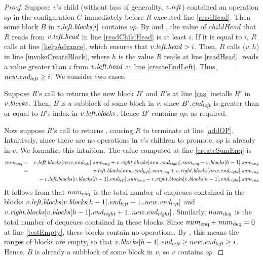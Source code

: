 \begin{proof}
Suppose $v$'s child (without loss of generality, $v.\mbox{\textit{left}}$) contained an operation $op$ 
in the configuration $C$ immediately before $R$ executed line \ref{readHead}.
Then some block $B$ in $v.\mbox{\textit{left.blocks}}[i]$ contains $op$.
By  and , the value of $childHead$ that $R$ reads from
$v.\mbox{\textit{left.head}}$ in line \ref{readChildHead} is at least $i$.
If it is equal to $i$, $R$ calls  at line \ref{helpAdvance}, which ensures that 
$v.\mbox{\textit{left.head}} > i$.
Then, $R$ calls ($v,h$) in line \ref{invokeCreateBlock}, where $h$ is the value $R$ reads at line \ref{readHead}.
 reads a value greater than $i$ from $v.\mbox{\textit{left.head}}$ at line \ref{createEndLeft}.
Thus, $new.\mbox{\textit{end\textsubscript{left}}} \geq i$.  We consider two cases.

Suppose $R$'s call to  returns the new block $B'$ and $R$'s  at line \ref{cas} 
installs $B'$ in $v.\mbox{\textit{blocks}}$.
Then, $B$ is a subblock of some block in $v$, since  $B'.\mbox{\textit{end\textsubscript{left}}}$ is greater than or equal to $B$'s index
in $v.\mbox{\textit{left.blocks}}$.
Hence $B'$ contains $op$, as required.

Now suppose $R$'s call to  returns \nl, causing $R$ to terminate at line \ref{addOP}.
Intuitively, since there are no operations in $v$'s children to promote, $op$ is already in $v$.
We formalize this intuition.
The value computed at line \ref{createSumEnq} is
\begin{eqnarray*}
\mbox{\textnormal{\textit{num\textsubscript{enq}}}} 
&=& v.\mbox{\textit{left.blocks}}[new.\mbox{\textit{end\textsubscript{left}}}].\mbox{\textit{sum\textsubscript{enq}}} + v.\mbox{\textit{right.blocks}}[new.\mbox{\textit{end\textsubscript{right}}}].\mbox{\textit{sum\textsubscript{enq}}} - v.\mbox{\textit{blocks}}[h-1].\mbox{\textit{sum\textsubscript{enq}}} \\
&=& v.\mbox{\textit{left.blocks}}[new.\mbox{\textit{end\textsubscript{left}}}].\mbox{\textit{sum\textsubscript{enq}}} + v.\mbox{\textit{right.blocks}}[new.\mbox{\textit{end\textsubscript{right}}}].\mbox{\textit{sum\textsubscript{enq}}} \\
&&\mbox{ }- v.\mbox{\textit{left.blocks}}[v.\mbox{\textit{blocks}}[h-1].\mbox{\textit{end\textsubscript{left}}}].\mbox{\textit{sum\textsubscript{enq}}} - v.\mbox{\textit{right.blocks}}[v.\mbox{\textit{blocks}}[h-1].\mbox{\textit{end\textsubscript{right}}}].\mbox{\textit{sum\textsubscript{enq}}}
\end{eqnarray*}
It follows from  that $num\textsubscript{enq}$ is the total number of enqueues contained in the blocks
$v.\mbox{\textit{left.blocks}}[v.\mbox{\textit{blocks}}[h-1].\mbox{\textit{end\textsubscript{left}}}+1..new.\mbox{\textit{end\textsubscript{left}}}]$ and
$v.\mbox{\textit{right.blocks}}[v.\mbox{\textit{blocks}}[h-1].\mbox{\textit{end\textsubscript{right}}}+1..new.\mbox{\textit{end\textsubscript{right}}}]$.
Similarly, $num\textsubscript{deq}$ is the total number of dequeues contained in these blocks.
Since $num\textsubscript{enq}+num\textsubscript{deq}=0$ at line \ref{testEmpty},
these blocks contain no operations.
By , this means the ranges of blocks are empty, so that $v.\mbox{\textit{blocks}}[h-1].\mbox{\textit{end\textsubscript{left}}} \geq new.\mbox{\textit{end\textsubscript{left}}} \geq i$.
Hence, $B$ is already a subblock of some block in $v$, so $v$ contains $op$.
\end{proof}

